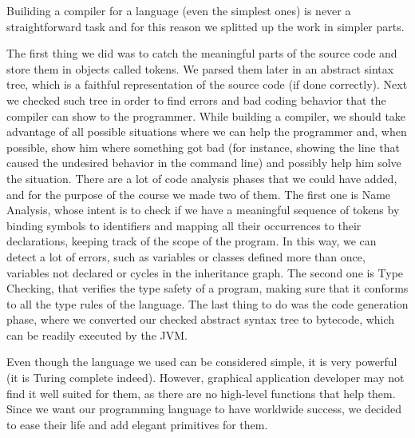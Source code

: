 Builiding a compiler for a language (even the simplest ones) is never a straightforward task and for this reason we splitted up the work in simpler parts.

The first thing we did was to catch the meaningful parts of the source code and store them in objects called tokens.
We parsed them later in an abstract sintax tree, which is a faithful representation of the source code (if done correctly).
Next we checked such tree in order to find errors and bad coding behavior that the compiler can show to the programmer.
While building a compiler, we should take advantage of all possible situations where we can help the programmer and, when possible, show him where something got bad (for instance, showing the line that caused the undesired behavior in the command line) and possibly help him solve the situation.
There are a lot of code analysis phases that we could have added, and for the purpose of the course we made two of them.
The first one is Name Analysis, whose intent is to check if we have a meaningful sequence of tokens by binding symbols to identifiers and mapping all their occurrences to their declarations, keeping track of the scope of the program.
In this way, we can detect a lot of errors, such as variables or classes defined more than once, variables not declared or cycles in the inheritance graph.
The second one is Type Checking, that verifies the type safety of a program, making sure that it conforms to all the type rules of the language.
The last thing to do was the code generation phase, where we converted our checked abstract syntax tree to bytecode, which can be readily executed by the JVM.

Even though the language we used can be considered simple, it is very powerful (it is Turing complete indeed).
However, graphical application developer may not find it well suited for them, as there are no high-level functions that help them.
Since we want our programming language to have worldwide success, we decided to ease their life and add elegant primitives for them. 